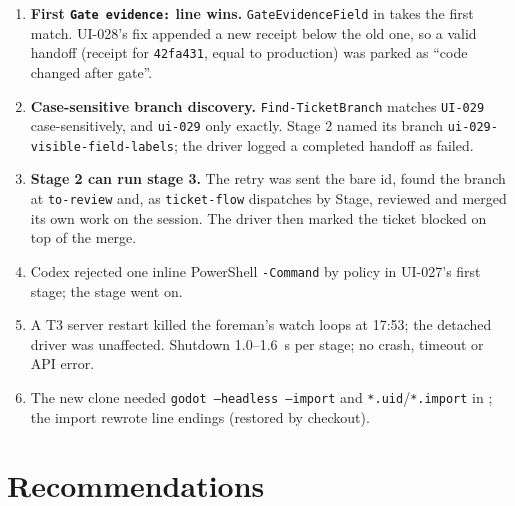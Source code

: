 \documentclass[11pt,a4paper]{article}
\begin{document}
\begin{enumerate}
  \item \textbf{First \texttt{Gate evidence:} line wins.} \texttt{GateEvidenceField} in
         takes the first match. UI-028's fix appended a new receipt below the old
        one, so a valid handoff (receipt for \texttt{42fa431}, equal to production) was parked as
        ``code changed after gate''.
  \item \textbf{Case-sensitive branch discovery.} \texttt{Find-TicketBranch} matches
        \texttt{UI-029} case-sensitively, and \texttt{ui-029} only exactly. Stage 2 named its branch
        \texttt{ui-029-visible-field-labels}; the driver logged a completed handoff as failed.
  \item \textbf{Stage 2 can run stage 3.} The retry was sent the bare id, found the branch at
        \texttt{to-review} and, as \texttt{ticket-flow} dispatches by Stage, reviewed and merged its
        own work on the session. The driver then marked the ticket blocked on top of the merge.
  \item Codex rejected one inline PowerShell \texttt{-Command} by policy in UI-027's first stage;
        the stage went on.
  \item A T3 server restart killed the foreman's watch loops at 17:53; the detached driver was
        unaffected. Shutdown 1.0--1.6~s per stage; no crash, timeout or API error.
  \item The new clone needed \texttt{godot --headless --import} and
        \texttt{*.uid}/\texttt{*.import} in ; the import rewrote
         line endings (restored by checkout).
\end{enumerate}

\section*{Recommendations}
\end{document}

